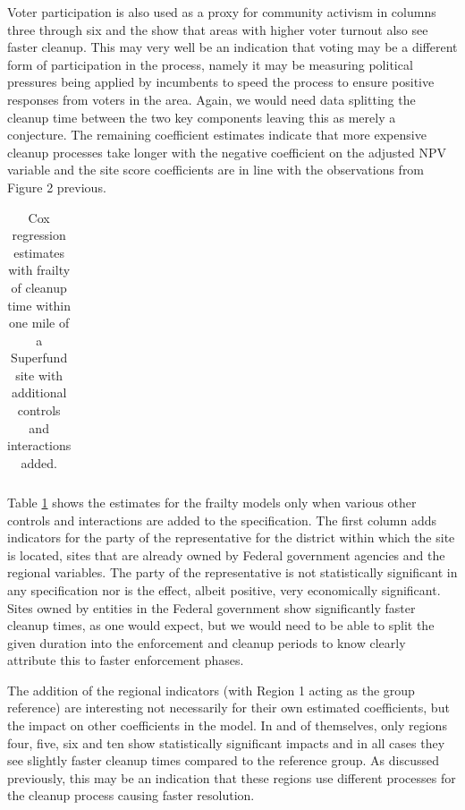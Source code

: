 \documentclass[12pt]{article}
\begin{document}
{Voter participation is also used as a proxy for community activism in columns three through six and the show that areas with higher voter turnout also see faster cleanup. This may very well be an indication that voting may be a different form of participation in the process, namely it may be measuring political pressures being applied by incumbents to speed the process to ensure positive responses from voters in the area. Again, we would need data splitting the cleanup time between the two key components leaving this as merely a conjecture. The remaining coefficient estimates indicate that more expensive cleanup processes take longer with the negative coefficient on the adjusted NPV variable and the site score coefficients are in line with the observations from Figure 2 previous. 

\begin{table}[t]
	\centering	\footnotesize
	\caption{\small Cox regression estimates with frailty of cleanup time within one mile of a Superfund site with additional controls and interactions added.} \label{cox2}
	\tabcolsep 9pt
		\begin{tabular}{lccc|ccc}
			
	\end{tabular}
\end{table}

Table \ref{cox2} shows the estimates for the frailty models only when various other controls and interactions are added to the specification. The first column adds indicators for the party of the representative for the district within which the site is located, sites that are already owned by Federal government agencies and the regional variables. The party of the representative is not statistically significant in any specification nor is the effect, albeit positive, very economically significant. Sites owned by entities in the Federal government show significantly faster cleanup times, as one would expect, but we would need to be able to split the given duration into the enforcement and cleanup periods to know clearly attribute this to faster enforcement phases. 

The addition of the regional indicators (with Region 1 acting as the group reference) are interesting not necessarily for their own estimated coefficients, but the impact on other coefficients in the model. In and of themselves, only regions four, five, six and ten show statistically significant impacts and in all cases they see slightly faster cleanup times compared to the reference group. As discussed previously, this may be an indication that these regions use different processes for the cleanup process causing faster resolution. 

}
\end{document}
